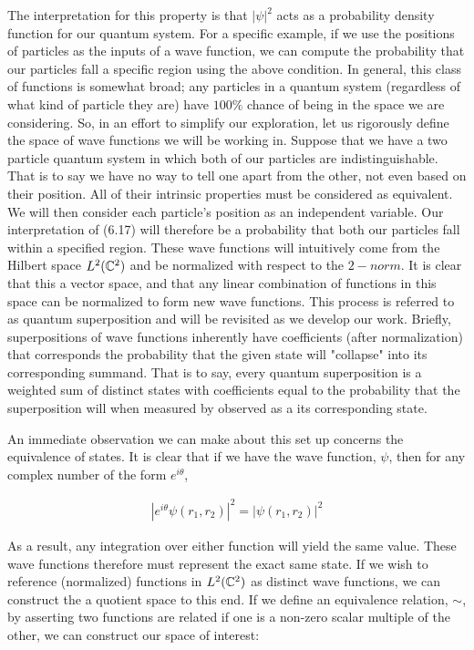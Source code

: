 The interpretation for this property is that $|\psi|^2$ acts as a probability density function for our quantum system. For a specific example, if we use the positions of particles as the inputs of a wave function, we can compute the probability that our particles fall a specific region using the above condition. In general, this class of functions is somewhat broad; any particles in a quantum system (regardless of what kind of particle they are) have $100\%$ chance of being in the space we are considering. So, in an effort to simplify our exploration, let us rigorously define the space of wave functions we will be working in. Suppose that we have a two particle quantum system in which both of our particles are indistinguishable. That is to say we have no way to tell one apart from the other, not even based on their position. All of their intrinsic properties must be considered as equivalent. We will then consider each particle's position as an independent variable. Our interpretation of (6.17) will therefore be a probability that both our particles fall within a specified region. These wave functions will intuitively come from the Hilbert space $L^2(\mathbb{C}^2)$ and be normalized with respect to the $2-norm$. It is clear that this a vector space, and that any linear combination of functions in this space can be normalized to form new wave functions. This process is referred to as quantum superposition and will be revisited as we develop our work. Briefly, superpositions of wave functions inherently have coefficients (after normalization) that corresponds the probability that the given state will "collapse" into its corresponding summand. That is to say, every quantum superposition is a weighted sum of distinct states with coefficients equal to the probability that the superposition will when measured by observed as a its corresponding state.

An immediate observation we can make about this set up concerns the equivalence of states. It is clear that if we have the wave function, $\psi$, then for any complex number of the form $e^{i\theta}$,

\begin{equation}
	\begin{aligned}
		|e^{i\theta}\psi(r_1,r_2)|^2 = |\psi(r_1,r_2)|^2 
	\end{aligned}
\end{equation}

As a result, any integration over either function will yield the same value. These wave functions therefore must represent the exact same state. If we wish to reference (normalized) functions in $L^2(\mathbb{C}^2)$ as distinct wave functions, we can construct the a quotient space to this end. If we define an equivalence relation, $\sim$, by asserting two functions are related if one is a non-zero scalar multiple of the other, we can construct our space of interest:

